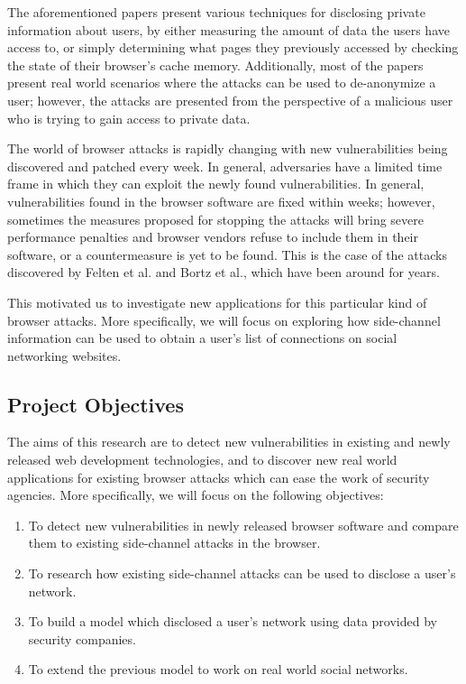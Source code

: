 \documentclass[a4paper,11pt]{article}
\begin{document}
The aforementioned papers present various techniques for disclosing private information about users, by either measuring the amount of data the users have access to, or simply determining what pages they previously accessed by checking the state of their browser's cache memory. Additionally, most of the papers present real world scenarios where the attacks can be used to de-anonymize a user; however, the attacks are presented from the perspective of a malicious user who is trying to gain access to private data.

The world of browser attacks is rapidly changing with new vulnerabilities being discovered and patched every week. In general, adversaries have a limited time frame in which they can exploit the newly found vulnerabilities. In general, vulnerabilities found in the browser software are fixed within weeks; however, sometimes the measures proposed for stopping the attacks will bring severe performance penalties and browser vendors refuse to include them in their software, or a countermeasure is yet to be found. This is the case of the attacks discovered by Felten et al.\cite{felten2000timing} and Bortz et al.\cite{bortz2007exposing}, which have been around for years. 

This motivated us to investigate new applications for this particular kind of browser attacks. More specifically, we will focus on exploring how side-channel information can be used to obtain a user's list of connections on social networking websites. 


\subsection*{Project Objectives}

The aims of this research are to detect new vulnerabilities in existing and newly released web development technologies, and to discover new real world applications for existing browser attacks which can ease the work of security agencies. More specifically, we will focus on the following objectives:
\begin{enumerate}
\item To detect new vulnerabilities in newly released browser software and compare them to existing side-channel attacks in the browser.
\item To research how existing side-channel attacks can be used to disclose a user's network.
\item To build a model which disclosed a user's network using data provided by security companies.
\item To extend the previous model to work on real world social networks.
\end{enumerate}
\end{document}
